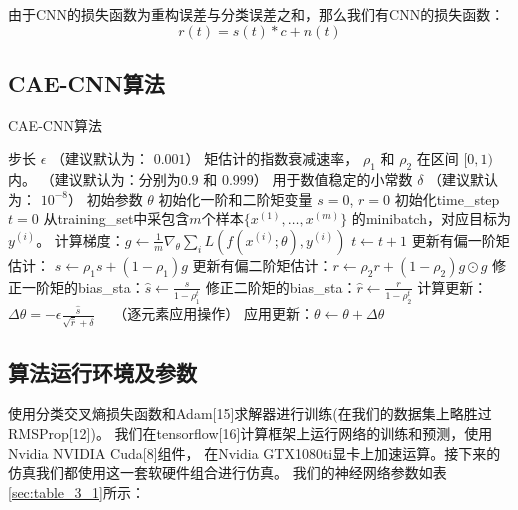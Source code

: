 由于CNN的损失函数为重构误差与分类误差之和，那么我们有CNN的损失函数：
\begin{equation}\label{sec:eqt3_4}
r(t) = s(t)*c + n(t)
\end{equation}


\subsection{CAE-CNN算法}

\begin{algorithm}[ht]
	\caption{CAE-CNN算法}
	\label{alg:CAE_CNN}
	\begin{algorithmic}
		\REQUIRE 步长 $\epsilon$ （建议默认为： $0.001$）
		\REQUIRE 矩估计的指数衰减速率， $\rho_1$ 和 $\rho_2$ 在区间 $[0, 1)$内。
		（建议默认为：分别为$0.9$ 和 $0.999$）
		\REQUIRE 用于数值稳定的小常数 $\delta$  （建议默认为： $10^{-8}$）
		\REQUIRE 初始参数 $\theta$
		\STATE 初始化一阶和二阶矩变量 $s = 0 $, $r = 0$
		\STATE 初始化\gls{time_step} $t=0$ 
		\STATE 从\gls{training_set}中采包含$m$个样本$\{ x^{(1)},\dots, x^{(m)}\}$ 的\gls{minibatch}，对应目标为$y^{(i)}$。
		\STATE 计算梯度：$g \leftarrow \frac{1}{m} \nabla_{\theta} \sum_i L(f(x^{(i)};\theta),y^{(i)})$ 
		\STATE $t \leftarrow t + 1$
		\STATE 更新有偏一阶矩估计： $s \leftarrow \rho_1 s + (1-\rho_1) g$
		\STATE 更新有偏二阶矩估计：$r \leftarrow \rho_2 r + (1-\rho_2)  g \odot g$
		\STATE 修正一阶矩的\gls{bias_sta}：$\hat{s} \leftarrow \frac{s}{1-\rho_1^t}$
		\STATE 修正二阶矩的\gls{bias_sta}：$\hat{r} \leftarrow \frac{r}{1-\rho_2^t}$
		\STATE 计算更新：$\Delta \theta = - \epsilon \frac{\hat{s}}{\sqrt{\hat{r}} + \delta}$ \ \  （逐元素应用操作）
		\STATE 应用更新：$\theta \leftarrow \theta + \Delta \theta$
		\ENDWHILE
	\end{algorithmic}
\end{algorithm}


\subsection{算法运行环境及参数}
使用分类交叉熵损失函数和Adam[15]求解器进行训练(在我们的数据集上略胜过RMSProp[12])。
我们在tensorflow[16]计算框架上运行网络的训练和预测，使用Nvidia NVIDIA Cuda[8]组件，
在Nvidia GTX1080ti显卡上加速运算。接下来的仿真我们都使用这一套软硬件组合进行仿真。
我们的神经网络参数如表\ref{sec:table_3_1}所示：\par

